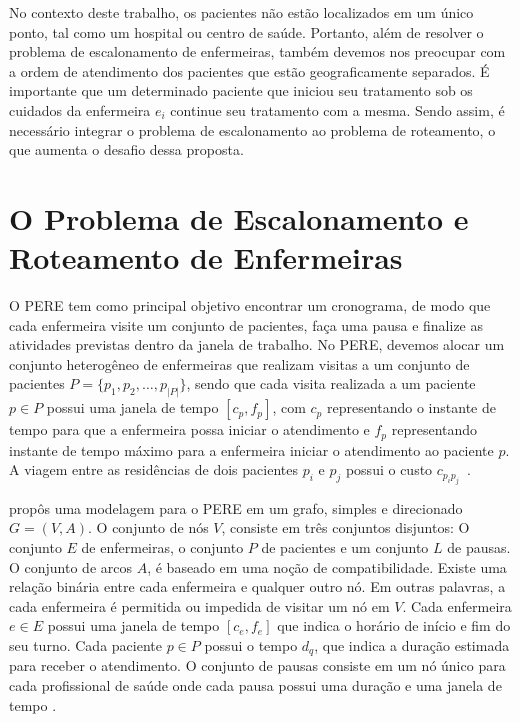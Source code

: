 No contexto deste trabalho, os pacientes não estão localizados em um único ponto, tal como um hospital ou centro de saúde. Portanto, al\'em de resolver o problema de escalonamento de enfermeiras, tamb\'em devemos nos preocupar com a ordem de atendimento dos pacientes que estão geograficamente separados. \'E importante que um determinado paciente que iniciou seu tratamento sob os cuidados da enfermeira $e_i$ continue seu tratamento com a mesma. Sendo assim, \'e necess\'ario integrar o problema de escalonamento ao problema de roteamento, o que aumenta o desafio dessa proposta.

\section{O Problema de Escalonamento e Roteamento de Enfermeiras}

O \acf{PERE} tem como principal objetivo encontrar um cronograma, de modo que cada enfermeira visite um conjunto de pacientes, faça uma pausa e finalize as atividades previstas dentro da janela de trabalho. No \ac{PERE}, devemos alocar um conjunto heterogêneo de enfermeiras  que realizam visitas a um conjunto de pacientes  $P = \{ p_1, p_2, \ldots, p_{|P|} \}$, sendo que cada visita realizada a um paciente $p \in P$ possui uma janela de tempo $[c_{p}, f_{p}]$, com $c_{p}$ representando o instante de tempo para que a enfermeira possa iniciar o atendimento e $f_{p}$ representando instante de tempo m\'aximo para a enfermeira iniciar o atendimento ao paciente $p$. A viagem entre as residências de dois pacientes $p_i$ e $p_j$  possui o custo $c_{p_ip_j}$~\cite{rasmussenm:2012}.   

\cite{cheng:98} prop\^os uma modelagem para o \ac{PERE} em um grafo, simples e direcionado $G = (V,A)$. O conjunto de nós $V$, consiste em três conjuntos disjuntos: O conjunto $E$ de enfermeiras, o conjunto $P$ de pacientes e um conjunto $L$ de pausas. O conjunto de arcos $A$, é baseado em uma noção de compatibilidade. Existe uma relação binária entre cada enfermeira e qualquer outro nó. Em outras palavras, a cada enfermeira é permitida ou impedida de visitar um nó em $V$. Cada enfermeira $e \in E$ possui uma janela de tempo $[c_e, f_e]$ que indica o horário de início e fim do seu turno.  Cada paciente $p \in P$ possui o tempo $d_q$, que indica a duraç\~ao estimada para receber o atendimento. O conjunto de pausas consiste em um nó único para cada profissional de saúde onde cada pausa possui uma duração e uma janela de tempo \cite{cheng:98}.

